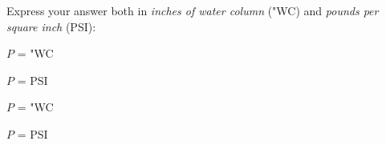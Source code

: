 Express your answer both in {\it inches of water column} ("WC) and {\it pounds per square inch} (PSI):

\vskip 10pt

$P$ = \underbar{\hskip 50pt} "WC

\vskip 10pt

$P$ = \underbar{\hskip 50pt} PSI








$P$ =  "WC

\vskip 10pt

$P$ =  PSI
 











